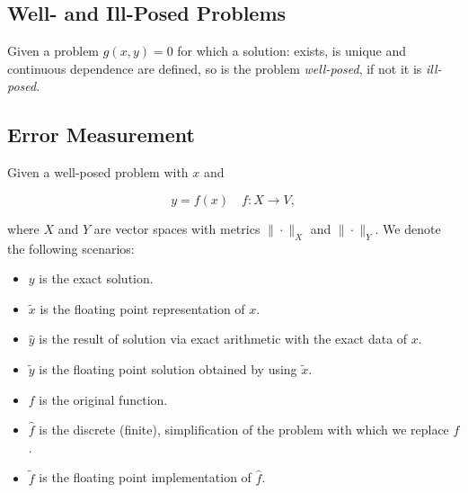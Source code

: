 \subsection{Well- and Ill-Posed Problems}

Given a problem \(g(x, y) = 0\) for which a solution: exists, is unique and continuous dependence are defined, so is the problem 
\emph{well-posed}, if not it is \emph{ill-posed}.

\subsection{Error Measurement}

Given a well-posed problem with \(x\) and  

\[
    y = f(x) \quad f: X \to V,
\]

where \(X\) and \(Y\) are vector spaces with metrics \(\|\cdot\|_X\) and \(\|\cdot\|_Y\). We denote 
the following scenarios: 

\begin{center}
\end{center}

\begin{itemize}
   
    \item \(y\) is the exact solution. 
  
    \item \(\tilde{x}\) is the floating point representation of \(x\). 
 
    \item \(\hat{y}\) is the result of solution via exact arithmetic with the exact data of \(x\). 

    \item \(\tilde{y}\) is the floating point solution obtained by using \(\tilde{x}\).

    \item \(f\) is the original function. 

    \item \(\hat{f}\) is the discrete (finite), simplification of the problem with which we replace \(f\). 

    \item \(\tilde{f}\) is the floating point implementation of \(\hat{f}\).
    
\end{itemize}

